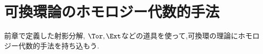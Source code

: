 \part[Homological method to ring theory]{可換環論のホモロジー代数的手法}
前章で定義した射影分解, $\Tor,\Ext$などの道具を使って,可換環の理論にホモロジー代数的手法を持ち込もう.